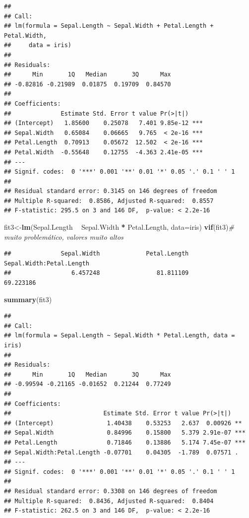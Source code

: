 \documentclass[
]{book}
\newenvironment{Shaded}{\begin{snugshade}}{\end{snugshade}}
\newcommand{\CommentTok}[1]{\textcolor[rgb]{0.56,0.35,0.01}{\textit{#1}}}
\newcommand{\DataTypeTok}[1]{\textcolor[rgb]{0.13,0.29,0.53}{#1}}
\newcommand{\KeywordTok}[1]{\textcolor[rgb]{0.13,0.29,0.53}{\textbf{#1}}}
\newcommand{\NormalTok}[1]{#1}
\newcommand{\OperatorTok}[1]{\textcolor[rgb]{0.81,0.36,0.00}{\textbf{#1}}}
\newcommand{\StringTok}[1]{\textcolor[rgb]{0.31,0.60,0.02}{#1}}
\begin{document}
\begin{verbatim}
## 
## Call:
## lm(formula = Sepal.Length ~ Sepal.Width + Petal.Length + Petal.Width, 
##     data = iris)
## 
## Residuals:
##      Min       1Q   Median       3Q      Max 
## -0.82816 -0.21989  0.01875  0.19709  0.84570 
## 
## Coefficients:
##              Estimate Std. Error t value Pr(>|t|)    
## (Intercept)   1.85600    0.25078   7.401 9.85e-12 ***
## Sepal.Width   0.65084    0.06665   9.765  < 2e-16 ***
## Petal.Length  0.70913    0.05672  12.502  < 2e-16 ***
## Petal.Width  -0.55648    0.12755  -4.363 2.41e-05 ***
## ---
## Signif. codes:  0 '***' 0.001 '**' 0.01 '*' 0.05 '.' 0.1 ' ' 1
## 
## Residual standard error: 0.3145 on 146 degrees of freedom
## Multiple R-squared:  0.8586, Adjusted R-squared:  0.8557 
## F-statistic: 295.5 on 3 and 146 DF,  p-value: < 2.2e-16
\end{verbatim}

\begin{Shaded}
\begin{Highlighting}[]
\NormalTok{fit3<-}\KeywordTok{lm}\NormalTok{(Sepal.Length }\OperatorTok{~}\StringTok{ }\NormalTok{Sepal.Width }\OperatorTok{*}\StringTok{ }\NormalTok{Petal.Length, }\DataTypeTok{data=}\NormalTok{iris)}
\KeywordTok{vif}\NormalTok{(fit3)}\CommentTok{# muito problemático, valores muito altos}
\end{Highlighting}
\end{Shaded}

\begin{verbatim}
##              Sepal.Width             Petal.Length Sepal.Width:Petal.Length 
##                 6.457248                81.811109                69.223186
\end{verbatim}

\begin{Shaded}
\begin{Highlighting}[]
\KeywordTok{summary}\NormalTok{(fit3)}
\end{Highlighting}
\end{Shaded}

\begin{verbatim}
## 
## Call:
## lm(formula = Sepal.Length ~ Sepal.Width * Petal.Length, data = iris)
## 
## Residuals:
##      Min       1Q   Median       3Q      Max 
## -0.99594 -0.21165 -0.01652  0.21244  0.77249 
## 
## Coefficients:
##                          Estimate Std. Error t value Pr(>|t|)    
## (Intercept)               1.40438    0.53253   2.637  0.00926 ** 
## Sepal.Width               0.84996    0.15800   5.379 2.91e-07 ***
## Petal.Length              0.71846    0.13886   5.174 7.45e-07 ***
## Sepal.Width:Petal.Length -0.07701    0.04305  -1.789  0.07571 .  
## ---
## Signif. codes:  0 '***' 0.001 '**' 0.01 '*' 0.05 '.' 0.1 ' ' 1
## 
## Residual standard error: 0.3308 on 146 degrees of freedom
## Multiple R-squared:  0.8436, Adjusted R-squared:  0.8404 
## F-statistic: 262.5 on 3 and 146 DF,  p-value: < 2.2e-16
\end{verbatim}
\end{document}
